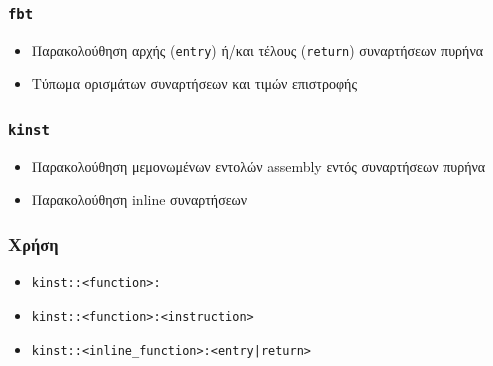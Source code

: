 \documentclass{beamer}
\begin{document}
\begin{frame}
\frametitle{\lstinline{fbt}}

\begin{itemize}
	\item Παρακολούθηση αρχής (\lstinline{entry}) ή/και τέλους
		(\lstinline{return}) συναρτήσεων πυρήνα
	\item Τύπωμα ορισμάτων συναρτήσεων και τιμών επιστροφής
\end{itemize}

\end{frame}

\begin{frame}
\frametitle{\lstinline{kinst}}

\begin{itemize}
	\item Παρακολούθηση μεμονωμένων εντολών assembly εντός συναρτήσεων
		πυρήνα
	\item Παρακολούθηση inline συναρτήσεων
\end{itemize}

\end{frame}

\begin{frame}
\frametitle{Χρήση}

\begin{itemize}
	\item \lstinline{kinst::<function>:}
	\item \lstinline{kinst::<function>:<instruction>}
	\item \lstinline{kinst::<inline_function>:<entry|return>}
\end{itemize}

\end{frame}
\end{document}

